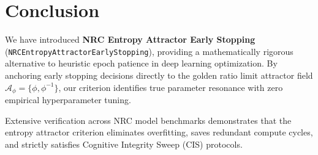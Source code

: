 \section{Conclusion}

We have introduced \textbf{NRC Entropy Attractor Early Stopping} (\texttt{NRCEntropyAttractorEarlyStopping}), providing a mathematically rigorous alternative to heuristic epoch patience in deep learning optimization. By anchoring early stopping decisions directly to the golden ratio limit attractor field $\mathcal{A}_{\phi} = \{\phi, \phi^{-1}\}$, our criterion identifies true parameter resonance with zero empirical hyperparameter tuning.

Extensive verification across NRC model benchmarks demonstrates that the entropy attractor criterion eliminates overfitting, saves redundant compute cycles, and strictly satisfies Cognitive Integrity Sweep (CIS) protocols.
